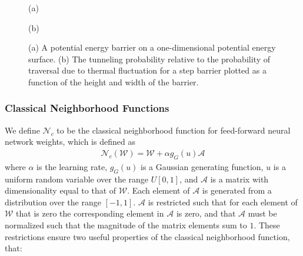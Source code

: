 \documentclass[10pt,journal,cspaper,compsoc]{IEEEtran}
\begin{document}
\begin{figure}
	
	\begin{minipage}[b]{0.48\linewidth}
		\centering
		\centerline{}
		\centerline{(a)}\medskip
	\end{minipage}
	\hfill
	\begin{minipage}[b]{0.48\linewidth}
		\centering
		\centerline{}
		\centerline{(b)}\medskip
	\end{minipage}
	\caption{
		(a) A potential energy barrier on a one-dimensional potential energy surface.
		(b) The tunneling probability relative to the probability of traversal due to thermal fluctuation for a step barrier plotted as a function of the height and width of the barrier.}
	\label{fig:quantum_advantage}
\end{figure}



\subsubsection{Classical Neighborhood Functions}
\label{scn:classical_neighborhood}

We define \begin{math}\mathcal{N}_{c}\end{math} to be the classical neighborhood function for feed-forward neural network weights, which is defined as \begin{align}\label{eq:classical_anisotropic_neighborhood}
	\mathcal{N}_{c} (\boldsymbol{\mathcal{W}}) = \boldsymbol{\mathcal{W}} + \alpha g_{G}(u) \boldsymbol{\mathcal{A}} 
\end{align}
\noindent where $\alpha$ is the learning rate, $g_{G}(u)$ is a Gaussian generating function, $u$ is a uniform random variable over the range $U[0,1]$, and $\boldsymbol{\mathcal{A}}$ is a matrix with dimensionality equal to that of $\boldsymbol{\mathcal{W}}$. Each element of $\boldsymbol{\mathcal{A}}$ is generated from a distribution over the range $[-1,1]$.  $\boldsymbol{\mathcal{A}}$ is restricted such that for each element of $\boldsymbol{\mathcal{W}}$ that is zero the corresponding element in $\boldsymbol{\mathcal{A}}$ is zero, and that $\boldsymbol{\mathcal{A}}$ must be normalized such that the magnitude of the matrix elements sum to $1$. These restrictions ensure two useful properties of the classical neighborhood function, that: 
\end{document}
